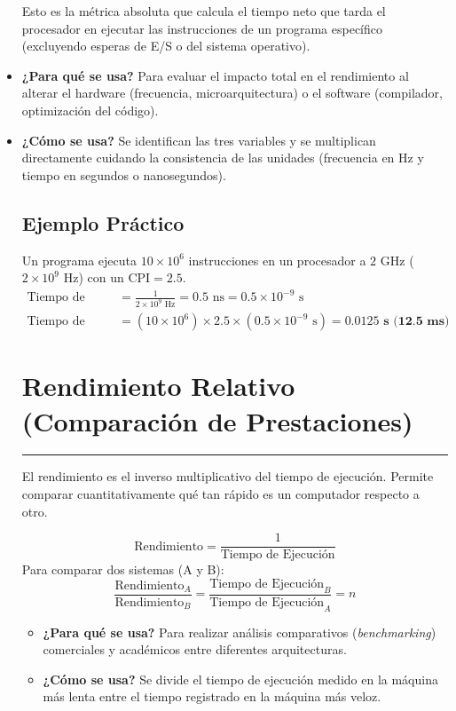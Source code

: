 \documentclass[12pt,a4paper]{article}
\begin{document}
\begin{itemize}[leftmargin=*]
    Esto es la métrica absoluta que calcula el tiempo neto que tarda el procesador en ejecutar las instrucciones de un programa específico (excluyendo esperas de E/S o del sistema operativo).
    \item \textbf{¿Para qué se usa?} Para evaluar el impacto total en el rendimiento al alterar el hardware (frecuencia, microarquitectura) o el software (compilador, optimización del código).
    \item \textbf{¿Cómo se usa?} Se identifican las tres variables y se multiplican directamente cuidando la consistencia de las unidades (frecuencia en Hz y tiempo en segundos o nanosegundos).


\subsection*{Ejemplo Práctico}
Un programa ejecuta $10 \times 10^6$ instrucciones en un procesador a $2\text{ GHz}$ ($2 \times 10^9\text{ Hz}$) con un $\text{CPI} = 2.5$.
\begin{align*}
\text{Tiempo de Ciclo} &= \frac{1}{2 \times 10^9\text{ Hz}} = 0.5\text{ ns} = 0.5 \times 10^{-9}\text{ s} \\
\text{Tiempo de CPU} &= (10 \times 10^6) \times 2.5 \times (0.5 \times 10^{-9}\text{ s}) = \mathbf{0.0125\text{ s (12.5 ms)}}
\end{align*}

\section{\textbf{Rendimiento Relativo (Comparación de Prestaciones)}}
{\color{moradovivo}\hrule height 1pt} \vspace{0.3cm}
El rendimiento es el inverso multiplicativo del tiempo de ejecución. Permite comparar cuantitativamente qué tan rápido es un computador respecto a otro.

\begin{tcolorbox}
\[
\text{Rendimiento} = \frac{1}{\text{Tiempo de Ejecución}}
\]
Para comparar dos sistemas (A y B):
\[
\frac{\text{Rendimiento}_A}{\text{Rendimiento}_B} = \frac{\text{Tiempo de Ejecución}_B}{\text{Tiempo de Ejecución}_A} = n
\]
\end{tcolorbox}

\begin{itemize}[leftmargin=*]
    Es una medida comparativa de velocidad. Si el ratio $n > 1$, se concluye formalmente que \textit{``la máquina A es $n$ veces más rápida que la máquina B''}.
    \item \textbf{¿Para qué se usa?} Para realizar análisis comparativos (\textit{benchmarking}) comerciales y académicos entre diferentes arquitecturas.
    \item \textbf{¿Cómo se usa?} Se divide el tiempo de ejecución medido en la máquina más lenta entre el tiempo registrado en la máquina más veloz.



\end{itemize}
\end{itemize}
\end{document}
